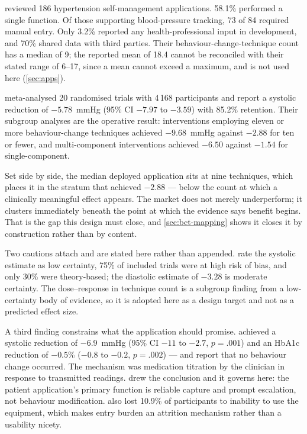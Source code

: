 \documentclass[12pt,a4paper,oneside]{report}
\begin{document}
\Textcite{alessa2019} reviewed 186 hypertension self-management applications. 58.1\% performed a single function. Of those supporting blood-pressure tracking, 73 of 84 required manual entry. Only 3.2\% reported any health-professional input in development, and 70\% shared data with third parties. Their behaviour-change-technique count has a median of 9; the reported mean of 18.4 cannot be reconciled with their stated range of 6--17, since a mean cannot exceed a maximum, and is not used here (\cref{sec:apps}).

\Textcite{zhou2024} meta-analysed 20 randomised trials with 4\,168 participants and report a systolic reduction of $-5.78$~mmHg (95\% CI $-7.97$ to $-3.59$) with 85.2\% retention. Their subgroup analyses are the operative result: interventions employing eleven or more behaviour-change techniques achieved $-9.68$~mmHg against $-2.88$ for ten or fewer, and multi-component interventions achieved $-6.50$ against $-1.54$ for single-component.

Set side by side, the median deployed application sits at nine techniques, which places it in the stratum that achieved $-2.88$ --- below the count at which a clinically meaningful effect appears. The market does not merely underperform; it clusters immediately beneath the point at which the evidence says benefit begins. That is the gap this design must close, and \cref{sec:bct-mapping} shows it closes it by construction rather than by content.

Two cautions attach and are stated here rather than appended. \Textcite{zhou2024} rate the systolic estimate as low certainty, 75\% of included trials were at high risk of bias, and only 30\% were theory-based; the diastolic estimate of $-3.28$ is moderate certainty. The dose--response in technique count is a subgroup finding from a low-certainty body of evidence, so it is adopted here as a design target and not as a predicted effect size.

A third finding constrains what the application should promise. \Textcite{mihevc2025} achieved a systolic reduction of $-6.9$~mmHg (95\% CI $-11$ to $-2.7$, $p = .001$) and an HbA1c reduction of $-0.5$\% ($-0.8$ to $-0.2$, $p = .002$) --- and report that no behaviour change occurred. The mechanism was medication titration by the clinician in response to transmitted readings.  drew the conclusion and it governs here: the patient application's primary function is reliable capture and prompt escalation, not behaviour modification. \Textcite{mihevc2025} also lost 10.9\% of participants to inability to use the equipment, which makes entry burden an attrition mechanism rather than a usability nicety.
\end{document}
